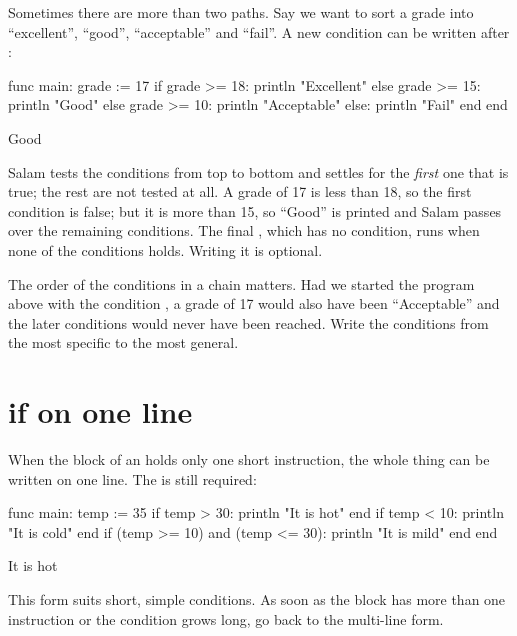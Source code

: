 Sometimes there are more than two paths. Say we want to sort a grade into
``excellent'', ``good'', ``acceptable'' and ``fail''. A new condition can be
written after :

\begin{salamcode}
func main:
    grade := 17
    if grade >= 18:
        println "Excellent"
    else grade >= 15:
        println "Good"
    else grade >= 10:
        println "Acceptable"
    else:
        println "Fail"
    end
end
\end{salamcode}

\begin{salamout}
Good
\end{salamout}

Salam tests the conditions from top to bottom and settles for the
\emph{first} one that is true; the rest are not tested at all. A grade of 17
is less than 18, so the first condition is false; but it is more than 15, so
``Good'' is printed and Salam passes over the remaining conditions. The
final , which has no condition, runs when none of the conditions
holds. Writing it is optional.

\begin{warn}
The order of the conditions in a chain matters. Had we started the program
above with the condition , a grade of 17 would also have
been ``Acceptable'' and the later conditions would never have been reached.
Write the conditions from the most specific to the most general.
\end{warn}

\section{if on one line}

When the block of an  holds only one short instruction, the whole
thing can be written on one line. The  is still required:

\begin{salamcode}
func main:
    temp := 35
    if temp > 30: println "It is hot" end
    if temp < 10: println "It is cold" end
    if (temp >= 10) and (temp <= 30): println "It is mild" end
end
\end{salamcode}

\begin{salamout}
It is hot
\end{salamout}

This form suits short, simple conditions. As soon as the block has more than
one instruction or the condition grows long, go back to the multi-line
form.

